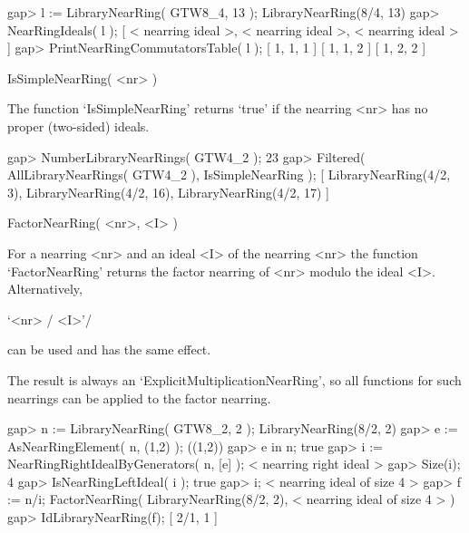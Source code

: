 \beginexample
    gap> l := LibraryNearRing( GTW8_4, 13 );
    LibraryNearRing(8/4, 13)
    gap> NearRingIdeals( l );
    [ < nearring ideal >, < nearring ideal >, < nearring ideal > ]
    gap> PrintNearRingCommutatorsTable( l );
    [ 1, 1, 1 ]
    [ 1, 1, 2 ]
    [ 1, 2, 2 ]
\endexample



\>IsSimpleNearRing( <nr> )

The function `IsSimpleNearRing' returns `true' if the nearring <nr> has
no proper (two-sided) ideals.


\beginexample
    gap> NumberLibraryNearRings( GTW4_2 );                         
    23
    gap> Filtered( AllLibraryNearRings( GTW4_2 ), IsSimpleNearRing );
    [ LibraryNearRing(4/2, 3), LibraryNearRing(4/2, 16), 
      LibraryNearRing(4/2, 17) ]
\endexample



\>FactorNearRing( <nr>, <I> )

For a nearring <nr> and an ideal <I> of the nearring <nr> the function
`FactorNearRing' returns the factor nearring of <nr> modulo the ideal <I>.
Alternatively,

\>`<nr> / <I>'{/}

can be used and has the same effect.

The result is always an `ExplicitMultiplicationNearRing', so all functions
for such nearrings can be applied to the factor nearring.

\beginexample
    gap> n := LibraryNearRing( GTW8_2, 2 );
    LibraryNearRing(8/2, 2)
    gap> e := AsNearRingElement( n, (1,2) );
    ((1,2))
    gap> e in n;
    true
    gap> i := NearRingRightIdealByGenerators( n, [e] );
    < nearring right ideal >
    gap> Size(i);
    4
    gap> IsNearRingLeftIdeal( i );
    true
    gap> i;
    < nearring ideal of size 4 >
    gap> f := n/i;          
    FactorNearRing( LibraryNearRing(8/2, 2), < nearring ideal of size 4 > )
    gap> IdLibraryNearRing(f);
    [ 2/1, 1 ]
\endexample



